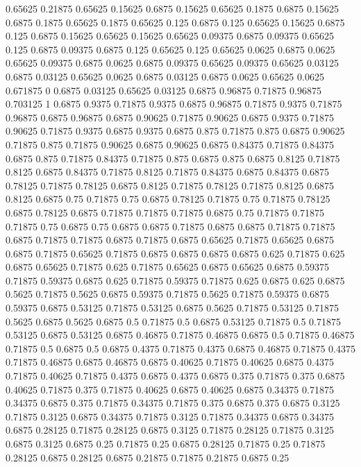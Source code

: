 0.65625 0.21875
0.65625 0.15625
0.6875 0.15625
0.65625 0.1875
0.6875 0.15625
0.6875 0.1875
0.65625 0.1875
0.65625 0.125
0.6875 0.125
0.65625 0.15625
0.6875 0.125
0.6875 0.15625
0.65625 0.15625
0.65625 0.09375
0.6875 0.09375
0.65625 0.125
0.6875 0.09375
0.6875 0.125
0.65625 0.125
0.65625 0.0625
0.6875 0.0625
0.65625 0.09375
0.6875 0.0625
0.6875 0.09375
0.65625 0.09375
0.65625 0.03125
0.6875 0.03125
0.65625 0.0625
0.6875 0.03125
0.6875 0.0625
0.65625 0.0625
0.671875 0
0.6875 0.03125
0.65625 0.03125
0.6875 0.96875
0.71875 0.96875
0.703125 1
0.6875 0.9375
0.71875 0.9375
0.6875 0.96875
0.71875 0.9375
0.71875 0.96875
0.6875 0.96875
0.6875 0.90625
0.71875 0.90625
0.6875 0.9375
0.71875 0.90625
0.71875 0.9375
0.6875 0.9375
0.6875 0.875
0.71875 0.875
0.6875 0.90625
0.71875 0.875
0.71875 0.90625
0.6875 0.90625
0.6875 0.84375
0.71875 0.84375
0.6875 0.875
0.71875 0.84375
0.71875 0.875
0.6875 0.875
0.6875 0.8125
0.71875 0.8125
0.6875 0.84375
0.71875 0.8125
0.71875 0.84375
0.6875 0.84375
0.6875 0.78125
0.71875 0.78125
0.6875 0.8125
0.71875 0.78125
0.71875 0.8125
0.6875 0.8125
0.6875 0.75
0.71875 0.75
0.6875 0.78125
0.71875 0.75
0.71875 0.78125
0.6875 0.78125
0.6875 0.71875
0.71875 0.71875
0.6875 0.75
0.71875 0.71875
0.71875 0.75
0.6875 0.75
0.6875 0.6875
0.71875 0.6875
0.6875 0.71875
0.71875 0.6875
0.71875 0.71875
0.6875 0.71875
0.6875 0.65625
0.71875 0.65625
0.6875 0.6875
0.71875 0.65625
0.71875 0.6875
0.6875 0.6875
0.6875 0.625
0.71875 0.625
0.6875 0.65625
0.71875 0.625
0.71875 0.65625
0.6875 0.65625
0.6875 0.59375
0.71875 0.59375
0.6875 0.625
0.71875 0.59375
0.71875 0.625
0.6875 0.625
0.6875 0.5625
0.71875 0.5625
0.6875 0.59375
0.71875 0.5625
0.71875 0.59375
0.6875 0.59375
0.6875 0.53125
0.71875 0.53125
0.6875 0.5625
0.71875 0.53125
0.71875 0.5625
0.6875 0.5625
0.6875 0.5
0.71875 0.5
0.6875 0.53125
0.71875 0.5
0.71875 0.53125
0.6875 0.53125
0.6875 0.46875
0.71875 0.46875
0.6875 0.5
0.71875 0.46875
0.71875 0.5
0.6875 0.5
0.6875 0.4375
0.71875 0.4375
0.6875 0.46875
0.71875 0.4375
0.71875 0.46875
0.6875 0.46875
0.6875 0.40625
0.71875 0.40625
0.6875 0.4375
0.71875 0.40625
0.71875 0.4375
0.6875 0.4375
0.6875 0.375
0.71875 0.375
0.6875 0.40625
0.71875 0.375
0.71875 0.40625
0.6875 0.40625
0.6875 0.34375
0.71875 0.34375
0.6875 0.375
0.71875 0.34375
0.71875 0.375
0.6875 0.375
0.6875 0.3125
0.71875 0.3125
0.6875 0.34375
0.71875 0.3125
0.71875 0.34375
0.6875 0.34375
0.6875 0.28125
0.71875 0.28125
0.6875 0.3125
0.71875 0.28125
0.71875 0.3125
0.6875 0.3125
0.6875 0.25
0.71875 0.25
0.6875 0.28125
0.71875 0.25
0.71875 0.28125
0.6875 0.28125
0.6875 0.21875
0.71875 0.21875
0.6875 0.25
